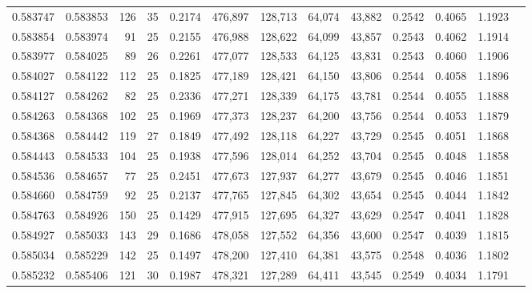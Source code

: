 \begin{tabular}{rrrrrrrrrrrrr}
0.583747 & 0.583853 & 126 &  35 &                                     0.2174 & 476,897 & 128,713 &  64,074 &  43,882 & 0.2542 & 0.4065 & 1.1923 \\
0.583854 & 0.583974 &  91 &  25 &                                     0.2155 & 476,988 & 128,622 &  64,099 &  43,857 & 0.2543 & 0.4062 & 1.1914 \\
0.583977 & 0.584025 &  89 &  26 &                                     0.2261 & 477,077 & 128,533 &  64,125 &  43,831 & 0.2543 & 0.4060 & 1.1906 \\
0.584027 & 0.584122 & 112 &  25 &                                     0.1825 & 477,189 & 128,421 &  64,150 &  43,806 & 0.2544 & 0.4058 & 1.1896 \\
0.584127 & 0.584262 &  82 &  25 &                                     0.2336 & 477,271 & 128,339 &  64,175 &  43,781 & 0.2544 & 0.4055 & 1.1888 \\
0.584263 & 0.584368 & 102 &  25 &                                     0.1969 & 477,373 & 128,237 &  64,200 &  43,756 & 0.2544 & 0.4053 & 1.1879 \\
0.584368 & 0.584442 & 119 &  27 &                                     0.1849 & 477,492 & 128,118 &  64,227 &  43,729 & 0.2545 & 0.4051 & 1.1868 \\
0.584443 & 0.584533 & 104 &  25 &                                     0.1938 & 477,596 & 128,014 &  64,252 &  43,704 & 0.2545 & 0.4048 & 1.1858 \\
0.584536 & 0.584657 &  77 &  25 &                                     0.2451 & 477,673 & 127,937 &  64,277 &  43,679 & 0.2545 & 0.4046 & 1.1851 \\
0.584660 & 0.584759 &  92 &  25 &                                     0.2137 & 477,765 & 127,845 &  64,302 &  43,654 & 0.2545 & 0.4044 & 1.1842 \\
0.584763 & 0.584926 & 150 &  25 &                                     0.1429 & 477,915 & 127,695 &  64,327 &  43,629 & 0.2547 & 0.4041 & 1.1828 \\
0.584927 & 0.585033 & 143 &  29 &                                     0.1686 & 478,058 & 127,552 &  64,356 &  43,600 & 0.2547 & 0.4039 & 1.1815 \\
0.585034 & 0.585229 & 142 &  25 &                                     0.1497 & 478,200 & 127,410 &  64,381 &  43,575 & 0.2548 & 0.4036 & 1.1802 \\
0.585232 & 0.585406 & 121 &  30 &                                     0.1987 & 478,321 & 127,289 &  64,411 &  43,545 & 0.2549 & 0.4034 & 1.1791 \\

\end{tabular}
